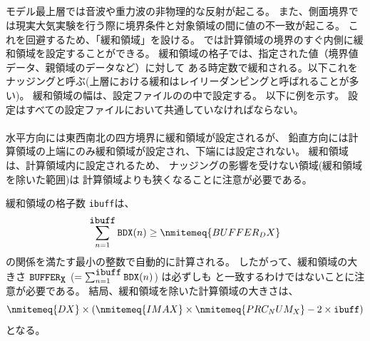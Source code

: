 \subsection{\SecBasicBufferSetting} \label{subsec:buffer}
モデル最上層では音波や重力波の非物理的な反射が起こる。
また、側面境界では現実大気実験を行う際に境界条件と対象領域の間に値の不一致が起こる。
これを回避するため、「緩和領域」を設ける。
\scalerm では計算領域の境界のすぐ内側に緩和領域を設定することができる。
緩和領域の格子では、指定された値（境界値データ、親領域のデータなど）に対して
ある時定数で緩和される。以下これをナッジングと呼ぶ(上層における緩和はレイリーダンピングと呼ばれることが多い)。
緩和領域の幅は、設定ファイルのの中で設定する。
以下に例を示す。
設定はすべての設定ファイルにおいて共通していなければならない。\\

\\

水平方向には東西南北の四方境界に緩和領域が設定されるが、
鉛直方向には計算領域の上端にのみ緩和領域が設定され、下端には設定されない。
%
緩和領域は、計算領域内に設定されるため、
ナッジングの影響を受けない領域(緩和領域を除いた範囲)は
計算領域よりも狭くなることに注意が必要である。

緩和領域の格子数 \verb|ibuff|は、
\[
\sum_{n=1}^{\verb|ibuff|} \verb|BDX|(n) \ge \nmitemeq{BUFFER_DX} \nonumber
\]
の関係を満たす最小の整数で自動的に計算される。
したがって、緩和領域の大きさ $\verb|BUFFER|_{\verb|X|}$ ($= \sum_{n=1}^{\verb|ibuff|} \verb|BDX|(n)$)
は必ずしも  と一致するわけではないことに注意が必要である。
結局、緩和領域を除いた計算領域の大きさは、
\[
\nmitemeq{DX} \times ( \nmitemeq{IMAX} \times \nmitemeq{PRC_NUM_X} - 2 \times \verb|ibuff| )
\]
となる。

